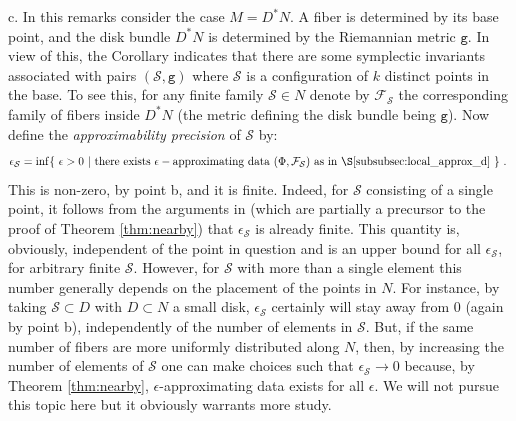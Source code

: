 \begin{rem}
c. In this remarks consider the case $M=D^{\ast}N$. A fiber is determined 
by its base point, and the disk bundle $D^{\ast}N$ is determined by the Riemannian metric $\mathtt{g}$. In view of this,  the Corollary indicates that there are some symplectic invariants associated with pairs $(\mathcal{S},\mathtt{g})$ where $\mathcal{S}$ is a configuration of $k$ distinct points in the base. To see this, for any finite 
family $\mathcal{S}\in N$ denote by $\mathcal{F}_{\mathcal{S}}$ the corresponding family of fibers inside $D^{\ast}N$ (the metric defining the disk bundle being $\mathtt{g}$). Now define the {\em approximability precision} of $\mathcal{S}$ by:
$$\epsilon_{\mathcal{S}}= \inf \{\  \epsilon > 0 \ | \  \mathrm{there\ exists}\ \epsilon-\mathrm{approximating\ data} \ (\Phi, \mathcal{F}_{\mathcal{S}}) \ \mathrm{as\ in}\  \S\ref{subsubsec:local_approx_d} \ \}~.~$$
This is non-zero, by point b, and it is finite. Indeed,  for $\mathcal{S}$ consisting of  a single point, it follows from the arguments in \cite{Bi-Co:mspectral} (which are partially a precursor to the proof of Theorem \ref{thm:nearby}) that $\epsilon_{\mathcal{S}}$ is already finite. This quantity is, obviously, independent of the point in question and is an upper bound for all $\epsilon_{\mathcal{S}}$, for arbitrary finite $\mathcal{S}$. However, for $\mathcal{S}$ with more than a single element this number generally depends on the placement of the points in $N$. For instance, by taking $\mathcal{S}\subset D$ with $D\subset N$ a small disk, $\epsilon_{\mathcal{S}}$ certainly will stay away from $0$ (again by point b),
independently of the number of elements in $\mathcal{S}$. 
But, if the same number of fibers are more uniformly distributed along $N$, then, by increasing the number of elements of $\mathcal{S}$ one can make choices such that $\epsilon_{\mathcal{S}}\to 0$ because, by Theorem \ref{thm:nearby},  $\epsilon$-approximating data exists for all $\epsilon$. We will not pursue this topic here but it obviously warrants more
study.
%
\end{rem}



